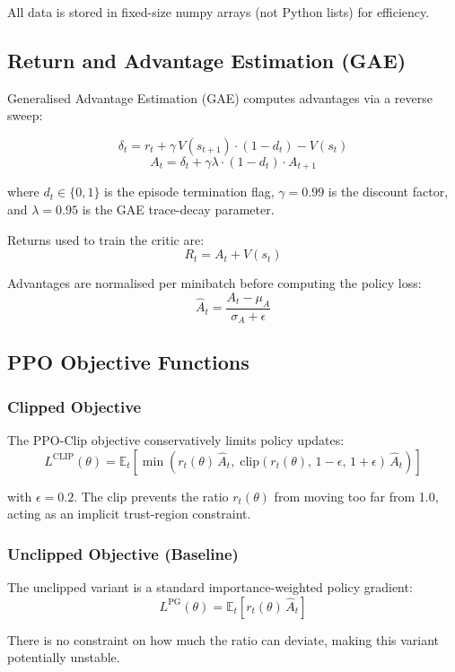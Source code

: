 \documentclass[12pt,a4paper]{article}
\begin{document}
All data is stored in fixed-size numpy arrays (not Python lists) for efficiency.

\subsection{Return and Advantage Estimation (GAE)}

Generalised Advantage Estimation (GAE) \cite{schulman2015high} computes advantages via a reverse sweep:

\[
\delta_t = r_t + \gamma \, V(s_{t+1}) \cdot (1 - d_t) - V(s_t)
\]
\[
A_t = \delta_t + \gamma \lambda \cdot (1 - d_t) \cdot A_{t+1}
\]

where $d_t \in \{0, 1\}$ is the episode termination flag, $\gamma = 0.99$ is the discount factor, and $\lambda = 0.95$ is the GAE trace-decay parameter.

Returns used to train the critic are:
\[
R_t = A_t + V(s_t)
\]

Advantages are normalised per minibatch before computing the policy loss:
\[
\hat{A}_t = \frac{A_t - \mu_A}{\sigma_A + \epsilon}
\]

\subsection{PPO Objective Functions}

\subsubsection{Clipped Objective}

The PPO-Clip objective conservatively limits policy updates:
\[
L^{\text{CLIP}}(\theta) = \mathbb{E}_t \left[ \min \left( r_t(\theta)\,\hat{A}_t,\; \text{clip}(r_t(\theta),\, 1-\epsilon,\, 1+\epsilon)\,\hat{A}_t \right) \right]
\]

with $\epsilon = 0.2$. The clip prevents the ratio $r_t(\theta)$ from moving too far from 1.0, acting as an implicit trust-region constraint.

\subsubsection{Unclipped Objective (Baseline)}

The unclipped variant is a standard importance-weighted policy gradient:
\[
L^{\text{PG}}(\theta) = \mathbb{E}_t \left[ r_t(\theta)\,\hat{A}_t \right]
\]

There is no constraint on how much the ratio can deviate, making this variant potentially unstable.
\end{document}
